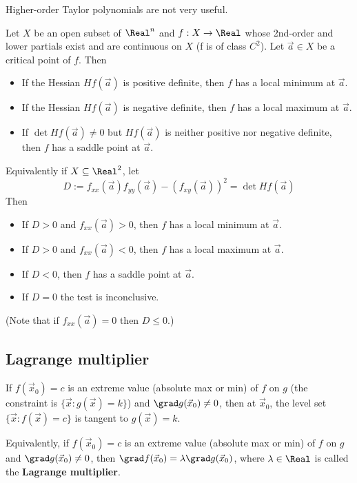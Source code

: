 Higher-order Taylor polynomials are not very useful.

\begin{theorem}
  Let $X$ be an open subset of $\Real^n$ and $f : X \to \Real$ whose 2nd-order and lower partials exist and are continuous on $X$ (f is of class $C^2$). Let $\vec{a} \in X$ be a critical point of $f$. Then
  \begin{itemize}
    \item If the Hessian $Hf(\vec{a})$ is positive definite, then $f$ has a local minimum at $\vec{a}$.
    \item If the Hessian $Hf(\vec{a})$ is negative definite, then $f$ has a local maximum at $\vec{a}$.
    \item If $\det Hf(\vec{a}) \neq 0$ but $Hf(\vec{a})$ is neither positive nor negative definite, then $f$ has a saddle point at $\vec{a}$.
  \end{itemize}

  Equivalently if $X \subseteq \Real^2$, let
  \[
    D := f_{xx}(\vec{a}) f_{yy}(\vec{a}) - \left(f_{xy}(\vec{a})\right)^2 = \det Hf(\vec{a})
  \]
  Then
  \begin{itemize}
    \item If $D > 0$ and $f_{xx}(\vec{a}) > 0$, then $f$ has a local minimum at $\vec{a}$.
    \item If $D > 0$ and $f_{xx}(\vec{a}) < 0$, then $f$ has a local maximum at $\vec{a}$.
    \item If $D < 0$, then $f$ has a saddle point at $\vec{a}$.
    \item If $D = 0$ the test is inconclusive.
  \end{itemize}

  (Note that if $f_{xx}(\vec{a}) = 0$ then $D \leq 0$.)
\end{theorem}

\subsection{Lagrange multiplier}

\begin{theorem}
  If $f(\vec{x}_0) = c$ is an extreme value (absolute max or min) of $f$ on $g$ (the constraint is $\{ \vec{x} : g(\vec{x}) = k \}$) and $\grad g(\vec{x}_0) \neq 0$, then at $\vec{x}_0$, the level set $\{ \vec{x} : f(\vec{x}) = c \}$ is tangent to $g(\vec{x}) = k$.

  Equivalently, if $f(\vec{x}_0) = c$ is an extreme value (absolute max or min) of $f$ on $g$ and $\grad g(\vec{x}_0) \neq 0$, then $\grad f(\vec{x}_0) = \lambda \grad g(\vec{x}_0)$, where $\lambda \in \Real$ is called the \textbf{Lagrange multiplier}.
\end{theorem}

